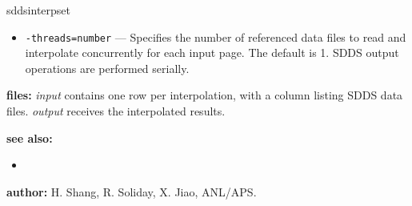 \begin{sddsprog}{sddsinterpset}
\begin{itemize}
      \item \verb|-threads=number| --- Specifies the number of referenced data files to read and
        interpolate concurrently for each input page. The default is 1. SDDS output operations are
        performed serially.
    \end{itemize}
  \item \textbf{files:}
    \emph{input} contains one row per interpolation, with a column listing SDDS data files. \emph{output} receives the interpolated results.
  \item \textbf{see also:}
    \begin{itemize}
      \item {}
    \end{itemize}
  \item \textbf{author:} H. Shang, R. Soliday, X. Jiao, ANL/APS.
\end{sddsprog}
